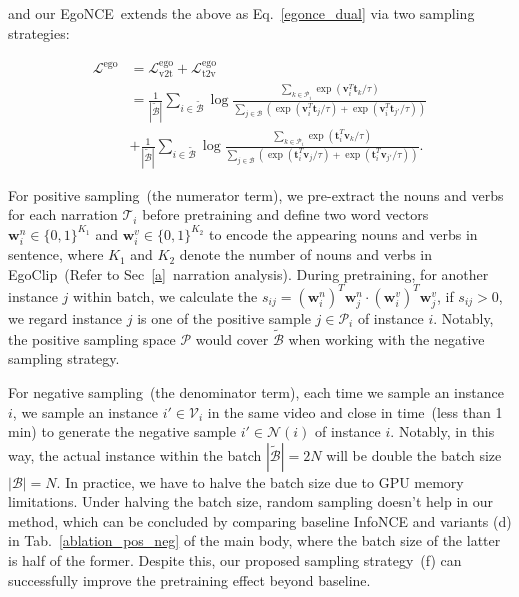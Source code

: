 \documentclass{article}
\newcommand{\dataset}{EgoClip}
\newcommand{\model}{EgoNCE\xspace}
\begin{document}
and our \model~extends the above as Eq.~\ref{egonce_dual} via two sampling strategies:

\begin{equation}
\begin{aligned}
	\mathcal{L}^\text{ego}&=\mathcal{L}_{\text{v2t}}^\text{ego}+\mathcal{L}_{\text{t2v}}^\text{ego}\\
	&=\frac{1}{| \mathcal{\widetilde{B}} |}\sum_{i\in\mathcal{\widetilde{B}}}  \log 
	\frac{
	{
	\sum_{k\in \mathcal{P}_i}\exp(\mathbf{v}_i^T\mathbf{t}_k /\tau)
	}
	}
	{  \sum_{j\in \mathcal{B}} \left( \exp(\mathbf{v}_i^T\mathbf{t}_j /\tau) +
	{\exp(\mathbf{v}_i^T\mathbf{t}_{j'} /\tau)}  \right) 
	} \\
	&+
	\frac{1}{| \mathcal{\widetilde{B}} |}\sum_{i\in\mathcal{\widetilde{B}}}  \log 
	\frac{
	{
	\sum_{k\in \mathcal{P}_i}\exp(\mathbf{t}_i^T\mathbf{v}_k /\tau)
	}
	}
	{  \sum_{j\in \mathcal{B}} \left( \exp(\mathbf{t}_i^T\mathbf{v}_j /\tau) +
	{\exp(\mathbf{t}_i^T\mathbf{v}_{j'} /\tau)}  \right) 
	}.
	\label{egonce_dual}
\end{aligned}
\end{equation}

For positive sampling~(the numerator term), we pre-extract the nouns and verbs for each narration $\mathcal{T}_i$ before pretraining and define two word vectors $\mathbf{w}_i^n\in \{0,1\}^{K_1}$ and  $\mathbf{w}_i^v\in \{0,1\}^{K_2}$ to encode the appearing nouns and verbs in sentence, where $K_1$ and $K_2$ denote the number of nouns and verbs in \dataset~(Refer to Sec~\ref{a}~narration analysis). 
During pretraining, for another instance $j$ within batch, we calculate the $s_{ij}=(\mathbf{w}_i^n)^T\mathbf{w}_j^n \cdot (\mathbf{w}_i^v)^T\mathbf{w}_j^v$, if $s_{ij}>0$, we regard instance $j$ is one of the positive sample $j\in \mathcal{P}_i$ of instance $i$.
Notably, the positive sampling space $\mathcal{P}$ would cover $\mathcal{\widetilde{B}}$ when working with the negative sampling strategy.

For negative sampling~(the denominator term), each time we sample an instance $i$, we sample an instance $i'\in \mathcal{V}_i$ in the same video and close in time~(less than 1 min) to generate the negative sample $i'\in \mathcal{N}(i)$ of instance $i$.
Notably, in this way, the actual instance within the batch $|\mathcal{\widetilde{B}}|=2N$ will be double the batch size $|\mathcal{B}|=N$.
In practice, we have to halve the batch size due to GPU memory limitations. 
Under halving the batch size, random sampling doesn't help in our method, which can be concluded by comparing baseline InfoNCE and variants (d) in Tab.~\ref{ablation_pos_neg} of the main body, where the batch size of the latter is half of the former. Despite this, our proposed sampling strategy~(f) can successfully improve the pretraining effect beyond baseline.
\end{document}
